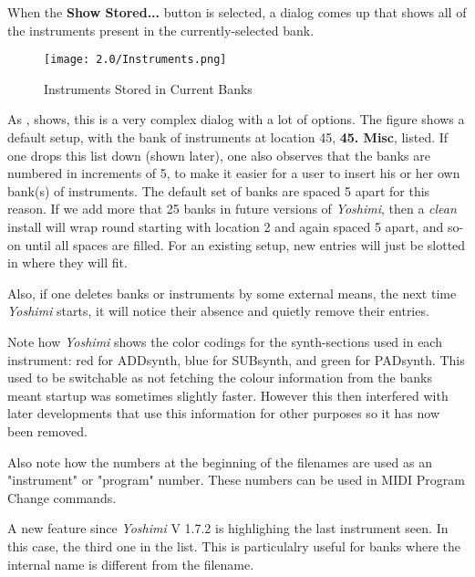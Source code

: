    When the \textbf{Show Stored...} button is selected, a dialog comes
   up that shows all of the instruments present in the currently-selected
   bank.

\begin{figure}[H]
   \centering
   \texttt{[image: 2.0/Instruments.png]}
   \caption[Show Stored Instruments]{Instruments Stored in Current Banks}
   \label{fig:instruments_show_stored}
\end{figure}

   As ,
   shows, this is a very complex dialog with a lot of options.
   The figure shows a default setup, with the bank of instruments at location
   45, \textbf{45. Misc}, listed.
   If one drops this list down (shown later), one also observes that the banks
   are numbered in increments of 5, to make it easier for a user to insert his
   or her own bank(s) of instruments. The default set of banks are spaced 5
   apart for this reason. If we add more that 25 banks in future versions of
   \textsl{Yoshimi}, then a \textsl{clean} install will wrap round starting with
   location 2 and again spaced 5 apart, and so-on until all spaces are filled.
   For an existing setup, new entries will just be slotted in where they
   will fit.

   Also, if one deletes banks or instruments by some external means, the next
   time \textsl{Yoshimi} starts, it will notice their absence and quietly
   remove their entries.

   Note how \textsl{Yoshimi} shows the color codings for the
   synth-sections used in each instrument:
   red for ADDsynth, blue for SUBsynth, and green for PADsynth.
   This used to be switchable as not fetching the colour information from the
   banks meant startup was sometimes slightly faster. However this then
   interfered with later developments that use this information for other
   purposes so it has now been removed.

   Also note how the numbers at the beginning of the filenames are used as
   an "instrument" or "program" number.  These numbers can be used in MIDI
   Program Change commands.

   A new feature since \textsl{Yoshimi} V 1.7.2 is highlighing the last
   instrument seen. In this case, the third one in the list. This is
   particulalry useful for banks where the internal name is different from the
   filename.


